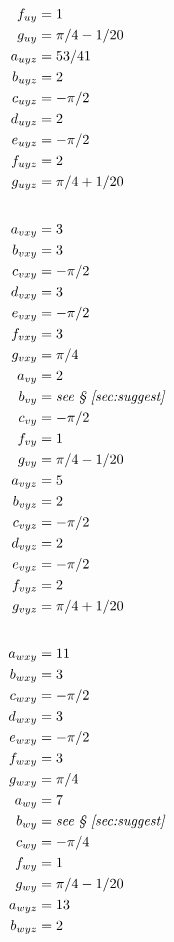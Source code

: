 \documentclass[10pt,reqno]{amsart}
\begin{document}
\begin{table}[p]
\begin{multicols}{3}
\begin{small}
\begin{align*}
f_{uy} &= 1 \\
g_{uy} &= \pi / 4 - 1 / 20 \\
a_{uyz} &= 53 / 41 \\
b_{uyz} &= 2 \\
c_{uyz} &= - \pi / 2 \\
d_{uyz} &= 2 \\
e_{uyz} &= - \pi / 2 \\
f_{uyz} &= 2 \\
g_{uyz} &= \pi / 4 + 1 / 20 \\
\intertext{}
a_{vxy} &= 3 \\
b_{vxy} &= 3 \\
c_{vxy} & = - \pi / 2 \\
d_{vxy} & = 3         \\
e_{vxy} & = - \pi / 2 \\
f_{vxy} &= 3 \\
g_{vxy} &= \pi / 4 \\
a_{vy} &= 2 \\
b_{vy} &= \text{\emph{see \textsection{}~\ref{sec:suggest}}} \\
c_{vy} &= - \pi / 2 \\
f_{vy} &= 1 \\
g_{vy} &= \pi / 4 - 1 / 20 \\
a_{vyz} &= 5 \\
b_{vyz} &= 2 \\
c_{vyz} &= -\pi / 2 \\
d_{vyz} &= 2 \\
e_{vyz} &= -\pi / 2 \\
f_{vyz} &= 2 \\
g_{vyz} &= \pi / 4 + 1 / 20 \\
\intertext{}
a_{wxy} &= 11 \\
b_{wxy} &= 3 \\
c_{wxy} &= -\pi / 2 \\
d_{wxy} &= 3 \\
e_{wxy} &= -\pi / 2 \\
f_{wxy} &= 3 \\
g_{wxy} &= \pi / 4 \\
a_{wy} &= 7 \\
b_{wy} &= \text{\emph{see \textsection{}~\ref{sec:suggest}}} \\
c_{wy} &= - \pi / 4 \\
f_{wy} &= 1 \\
g_{wy} &= \pi / 4 - 1 / 20 \\
a_{wyz} &= 13 \\
b_{wyz} &= 2 \\

\end{align*}
\end{small}
\end{multicols}
\end{table}
\end{document}
